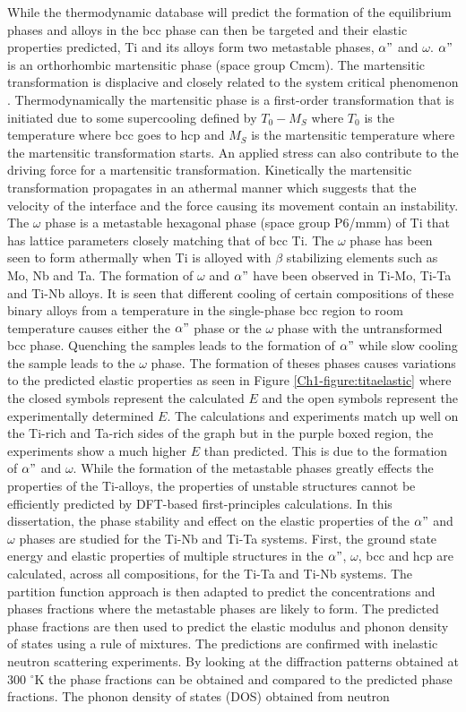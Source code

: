 While the thermodynamic database will predict the formation of the equilibrium phases and alloys in the bcc phase can then be targeted and their elastic properties predicted, Ti and its alloys form two metastable phases, $\alpha"$ and $\omega$. $\alpha"$ is an orthorhombic martensitic phase (space group Cmcm). The martensitic transformation is displacive and closely related to the system critical phenomenon \cite{Khachaturyan1985,Salje1990}. Thermodynamically the martensitic phase is a first-order transformation that is initiated due to some supercooling defined by $T_{0}-M_{S}$ where $T_{0}$ is the temperature where bcc goes to hcp and $M_{S}$ is the martensitic temperature where the martensitic transformation starts. An applied stress can also contribute to the driving force for a martensitic transformation. Kinetically the martensitic transformation propagates in an athermal manner which suggests that the velocity of the interface and the force causing its movement contain an instability. The $\omega$ phase is a metastable hexagonal phase (space group P6/mmm) of Ti that has lattice parameters closely matching that of bcc Ti. The $\omega$ phase has been seen to form athermally when Ti is alloyed with $\beta$ stabilizing elements such as Mo, Nb and Ta. The formation of $\omega$ and $\alpha"$ have been observed in Ti-Mo, Ti-Ta and Ti-Nb alloys. It is seen that different cooling of certain compositions of these binary alloys from a temperature in the single-phase bcc region to room temperature causes either the $\alpha"$ phase or the $\omega$ phase with the untransformed bcc phase. Quenching the samples leads to the formation of $\alpha"$ while slow cooling the sample leads to the $\omega$ phase. The formation of theses phases causes variations to the predicted elastic properties as seen in Figure \ref{Ch1-figure:titaelastic} where the closed symbols represent the calculated $E$ and the open symbols represent the experimentally determined $E$. The calculations and experiments match up well on the Ti-rich and Ta-rich sides of the graph but in the purple boxed region, the experiments show a much higher $E$ than predicted. This is due to the formation of $\alpha"$ and $\omega$. While the formation of the metastable phases greatly effects the properties of the Ti-alloys, the properties of unstable structures cannot be efficiently predicted by DFT-based first-principles calculations. In this dissertation, the phase stability and effect on the elastic properties of the $\alpha"$ and $\omega$ phases are studied for the Ti-Nb and Ti-Ta systems. First, the ground state energy and elastic properties of multiple structures in the $\alpha"$, $\omega$, bcc and hcp are calculated, across all compositions, for the Ti-Ta and Ti-Nb systems. The partition function approach is then adapted to predict the concentrations and phases fractions where the metastable phases are likely to form. The predicted phase fractions are then used to predict the elastic modulus and phonon density of states using a rule of mixtures. The predictions are confirmed with inelastic neutron scattering experiments. By looking at the diffraction patterns obtained at 300 $^\circ$K the phase fractions can be obtained and compared to the predicted phase fractions. The phonon density of states (DOS) obtained from neutron 